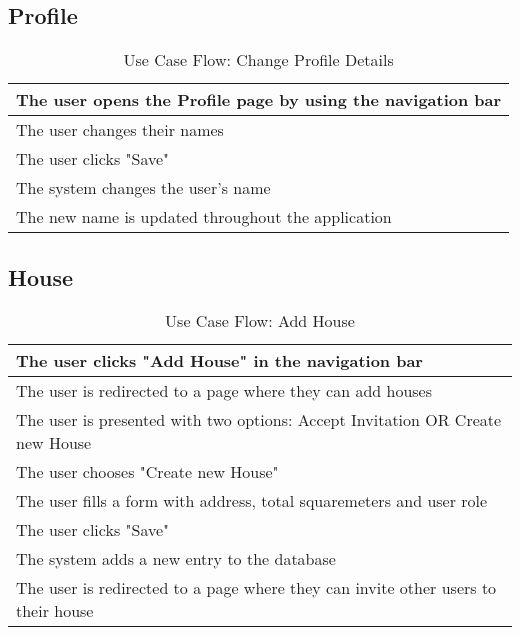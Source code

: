\subsection{Profile}
\begin{table}[H]
  \begin{tabularx}{\linewidth}{|X|}
    \hline
     The user opens the Profile page by using the navigation bar \\
     \hline
     The user changes their names \\
     \hline
     The user clicks "Save" \\
     \hline
     The system changes the user's name \\
     \hline 
     The new name is updated throughout the application \\
     \hline 
  \end{tabularx}
  \caption{Use Case Flow: Change Profile Details}
\end{table}


\subsection{House} \label{usecases:house}
\begin{table}[H]
  \begin{tabularx}{\linewidth}{|X|}
    \hline
     The user clicks "Add House" in the navigation bar \\
     \hline
     The user is redirected to a page where they can add houses \\
     \hline
     The user is presented with two options: Accept Invitation OR Create new House \\
     \hline 
     The user chooses "Create new House" \\
     \hline 
     The user fills a form with address, total squaremeters and user role \\
     \hline
     The user clicks "Save" \\
     \hline  
     The system adds a new entry to the database \\
     \hline  
     The user is redirected to a page where they can invite other users to their house \\
     \hline  
  \end{tabularx}
  \caption{Use Case Flow: Add House}
\end{table}

